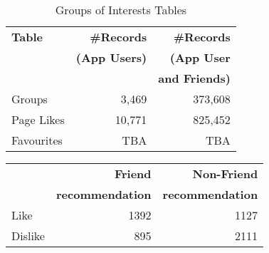 \begin{table}
\centering
\begin{tabular}{|>{\small}l|>{\small}r|>{\small}r|}
\hline
\textbf{Table} & \textbf{\#Records} & \textbf{\#Records} \\
& \textbf{(App Users)} & \textbf{(App User} \\
& & \textbf{and Friends)} \\
\hline
Groups & 3,469 & 373,608 \\
\hline
Page Likes & 10,771 & 825,452 \\
\hline
Favourites & TBA & TBA\\
\hline
\end{tabular}
\caption{Groups of Interests Tables}
\label{tab:interests}
\end{table}

\begin{table}
\centering
\begin{tabular}{|>{\small}l|>{\small}r|>{\small}r|}\hline
&\textbf{Friend}  & \textbf{Non-Friend} \\
&\textbf{recommendation}  & \textbf{recommendation} \\
\hline
Like& 1392 & 1127 \\
\hline
Dislike& 895 & 2111\\
\hline
\end{tabular}
\end{table}
